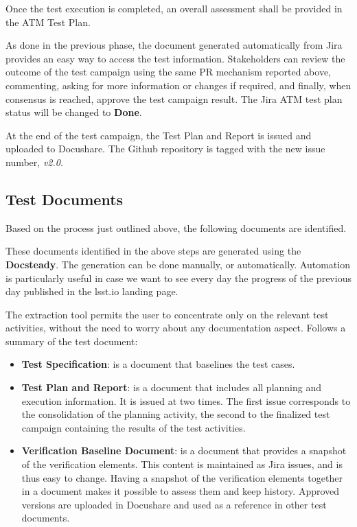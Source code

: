 Once the test execution is completed, an overall assessment shall be provided in the ATM Test Plan.

As done in the previous phase, the document generated automatically from Jira provides an easy way to access the test information.
Stakeholders can review the outcome of the test campaign using the same PR mechanism reported above, 
commenting, asking for more information or changes if required, and finally, when consensus is reached, approve the test campaign result.
The Jira ATM test plan status will be changed to \textbf{Done}.

At the end of the test campaign, the Test Plan and Report is issued and uploaded to Docushare.
The Github repository is tagged with the new issue number, \textit{v2.0}.


\subsection{Test Documents}

Based on the process just outlined above, the following documents are identified.

These documents identified in the above steps are generated using the \textbf{Docsteady}.
The generation can be done manually, or automatically.
Automation is particularly useful in case we want to see every day the progress of the previous day published in the lsst.io landing page.

The extraction tool permits the user to concentrate only on the relevant test activities, without the need to worry about any documentation aspect.
Follows a summary of the test document:

\begin{itemize}
\item \textbf{Test Specification}: is a document that baselines the test cases.
\item \textbf{Test Plan and Report}: is a document that includes all planning and execution information. 
It  is issued at two times. The first issue corresponds to the consolidation of the planning activity,  
the second to the finalized test campaign containing the results of the test activities.
\item \textbf{Verification Baseline Document}: is a document that provides a snapshot of the verification elements. 
This content is maintained as Jira issues, and is thus easy to change.
Having a snapshot of the verification elements together in a document makes it possible to assess them and keep history.
Approved versions are uploaded in Docushare and used as a reference in other test documents.
\end{itemize}

